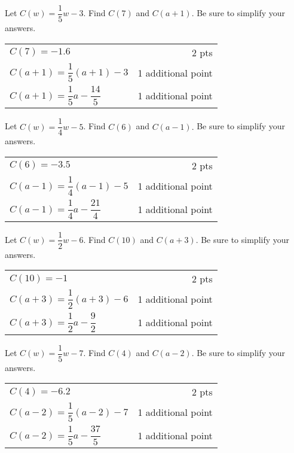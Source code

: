 {
	Let $C(w)=\dfrac{1}{5}w-3$. Find $C(7)$ and $C(a+1).$  Be sure to simplify your answers.
	
}
{
	\begin{tabular}{l r}
	$C(7)=-1.6$ & 2 pts\\
	$C(a+1)=\dfrac{1}{5}(a+1)-3$ & 1 additional point\\
	$C(a+1)=\dfrac{1}{5}a-\dfrac{14}{5}$ & 1 additional point
	\end{tabular}
}

{
	Let $C(w)=\dfrac{1}{4}w-5$. Find  $C(6)$ and  $C(a-1).$  Be sure to simplify your answers.
	
}
{
	\begin{tabular}{l r}
	$C(6)=-3.5$ & 2 pts\\
	$C(a-1)=\dfrac{1}{4}(a-1)-5$ & 1 additional point\\
	$C(a-1)=\dfrac{1}{4}a-\dfrac{21}{4}$ & 1 additional point
	\end{tabular}
}

{
	Let $C(w)=\dfrac{1}{2}w-6$. Find  $C(10)$ and  $C(a+3).$  Be sure to simplify your answers.
	
}
{
	\begin{tabular}{l r}
	$C(10)=-1$ & 2 pts\\
	$C(a+3)=\dfrac{1}{2}(a+3)-6$ & 1 additional point\\
	$C(a+3)=\dfrac{1}{2}a-\dfrac{9}{2}$ & 1 additional point
	\end{tabular}
}

{
	Let $C(w)=\dfrac{1}{5}w-7$. Find  $C(4)$ and  $C(a-2).$  Be sure to simplify your answers.
	
}
{
	\begin{tabular}{l r}
	$C(4)=-6.2$ & 2 pts\\
	$C(a-2)=\dfrac{1}{5}(a-2)-7$ & 1 additional point\\
	$C(a-2)=\dfrac{1}{5}a-\dfrac{37}{5}$ & 1 additional point
	\end{tabular}
}